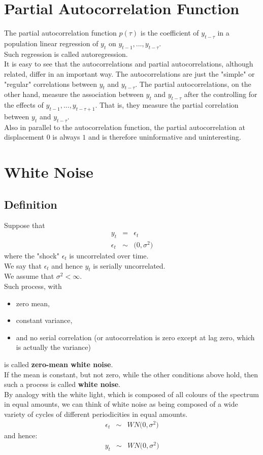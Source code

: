 \section{Partial Autocorrelation Function}
The partial autocorrelation function $p(\tau)$ is the coefficient of $y_{t-\tau}$ in a population linear regression of $y_{t}$ on $y_{t - 1}, ..., y_{t - \tau}$.\\
Such regression is called autoregression.\\
It is easy to see that the autocorrelations and partial autocorrelations, although related, differ in an important way. The autocorrelations are just the "simple" or "regular" correlations between $y_{t}$ and $y_{t - \tau}$. The partial autocorrelations, on the other hand, measure the association between $y_{t}$ and $y_{t - \tau}$ after the controlling for the effects of $y_{t - 1}, ..., y_{t - \tau + 1}$. That is, they measure the partial correlation between $y_{t}$ and $y_{t - \tau}$.\\
Also in parallel to the autocorrelation function, the partial autocorrelation at displacement $0$ is always $1$ and is therefore uninformative and uninteresting.


\section{White Noise}
\subsection{Definition}
Suppose that
\begin{eqnarray}
	y_{t} &=& \epsilon_{t}\\
	\epsilon_{t} &\sim& \big(0, \sigma^{2}\big)
\end{eqnarray}
where the "shock" $\epsilon_{t}$ is uncorrelated over time.\\
We say that $\epsilon_{t}$ and hence $y_{t}$ is serially uncorrelated.\\
We assume that $\sigma^{2} < \infty$.\\
Such process, with
\begin{itemize}
	\item zero mean,
	\item constant variance,
	\item and no serial correlation (or autocorrelation is zero except at lag zero, which is actually the variance)  
\end{itemize}
is called \textbf{\color{blue}zero-mean white noise}.\\
If the mean is constant, but not zero, while the other conditions above hold, then such a process is called \textbf{\color{blue}white noise}.\\
By analogy with the white light, which is composed of all colours of the spectrum in equal amounts, 
we can think of white noise as being composed of a wide variety of cycles of different periodicities in equal amounts.
\begin{eqnarray}
\epsilon_{t} &\sim& WN\Big(0, \sigma^{2}\Big)
\end{eqnarray}
and hence:
\begin{eqnarray}
	y_{t} &\sim& WN\Big(0, \sigma^{2}\Big)
\end{eqnarray}

